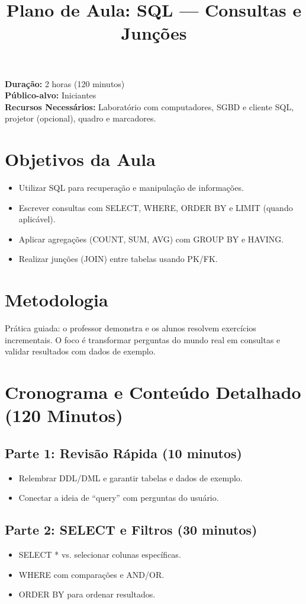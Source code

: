 \documentclass[12pt,a4paper]{article}
\title{Plano de Aula: SQL --- Consultas e Junções}
\date{}
\begin{document}
\maketitle

\noindent
\textbf{Duração:} 2 horas (120 minutos)\\
\textbf{Público-alvo:} Iniciantes\\
\textbf{Recursos Necessários:} Laboratório com computadores, SGBD e cliente SQL, projetor (opcional), quadro e marcadores.

\section{Objetivos da Aula}
\begin{itemize}[leftmargin=*,itemsep=0.25em]
  \item Utilizar SQL para recuperação e manipulação de informações.
  \item Escrever consultas com SELECT, WHERE, ORDER BY e LIMIT (quando aplicável).
  \item Aplicar agregações (COUNT, SUM, AVG) com GROUP BY e HAVING.
  \item Realizar junções (JOIN) entre tabelas usando PK/FK.
\end{itemize}

\section{Metodologia}
Prática guiada: o professor demonstra e os alunos resolvem exercícios incrementais. O foco é transformar perguntas do mundo real em consultas e validar resultados com dados de exemplo.

\section{Cronograma e Conteúdo Detalhado (120 Minutos)}
\subsection*{Parte 1: Revisão Rápida (10 minutos)}
\begin{itemize}[leftmargin=*,itemsep=0.35em]
  \item Relembrar DDL/DML e garantir tabelas e dados de exemplo.
  \item Conectar a ideia de ``query'' com perguntas do usuário.
\end{itemize}

\subsection*{Parte 2: SELECT e Filtros (30 minutos)}
\begin{itemize}[leftmargin=*,itemsep=0.35em]
  \item SELECT * vs. selecionar colunas específicas.
  \item WHERE com comparações e AND/OR.
  \item ORDER BY para ordenar resultados.
\end{itemize}
\end{document}
